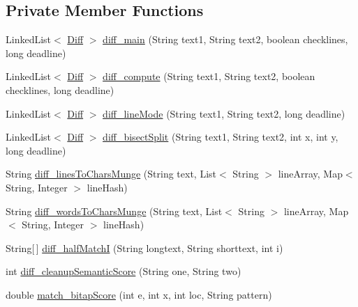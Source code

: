 \subsection*{Private Member Functions}
\begin{DoxyCompactItemize}
\item 
Linked\+List$<$ \hyperlink{classname_1_1fraser_1_1neil_1_1plaintext_1_1diff__match__patch_1_1Diff}{Diff} $>$ \hyperlink{classname_1_1fraser_1_1neil_1_1plaintext_1_1diff__match__patch_a5b206ee4b0fa0861d2dc975bf92708cc}{diff\+\_\+main} (String text1, String text2, boolean checklines, long deadline)
\item 
Linked\+List$<$ \hyperlink{classname_1_1fraser_1_1neil_1_1plaintext_1_1diff__match__patch_1_1Diff}{Diff} $>$ \hyperlink{classname_1_1fraser_1_1neil_1_1plaintext_1_1diff__match__patch_af831eef34cf9fb1526f869c83424b836}{diff\+\_\+compute} (String text1, String text2, boolean checklines, long deadline)
\item 
Linked\+List$<$ \hyperlink{classname_1_1fraser_1_1neil_1_1plaintext_1_1diff__match__patch_1_1Diff}{Diff} $>$ \hyperlink{classname_1_1fraser_1_1neil_1_1plaintext_1_1diff__match__patch_aa4b505e33c9597cffcc81ffbeee67a37}{diff\+\_\+line\+Mode} (String text1, String text2, long deadline)
\item 
Linked\+List$<$ \hyperlink{classname_1_1fraser_1_1neil_1_1plaintext_1_1diff__match__patch_1_1Diff}{Diff} $>$ \hyperlink{classname_1_1fraser_1_1neil_1_1plaintext_1_1diff__match__patch_a7caa378df4183ad8c7e6fc0afa7ef392}{diff\+\_\+bisect\+Split} (String text1, String text2, int x, int y, long deadline)
\item 
String \hyperlink{classname_1_1fraser_1_1neil_1_1plaintext_1_1diff__match__patch_a9ab83844e67949f57ed031c98a1e88d9}{diff\+\_\+lines\+To\+Chars\+Munge} (String text, List$<$ String $>$ line\+Array, Map$<$ String, Integer $>$ line\+Hash)
\item 
String \hyperlink{classname_1_1fraser_1_1neil_1_1plaintext_1_1diff__match__patch_a8e2e50b63d55ec69b6b5413338bc7578}{diff\+\_\+words\+To\+Chars\+Munge} (String text, List$<$ String $>$ line\+Array, Map$<$ String, Integer $>$ line\+Hash)
\item 
String\mbox{[}$\,$\mbox{]} \hyperlink{classname_1_1fraser_1_1neil_1_1plaintext_1_1diff__match__patch_a85b4cb8c6f4dd34bf9cdca1a16261162}{diff\+\_\+half\+MatchI} (String longtext, String shorttext, int i)
\item 
int \hyperlink{classname_1_1fraser_1_1neil_1_1plaintext_1_1diff__match__patch_aab2f9b680e022416729568ceb1c73109}{diff\+\_\+cleanup\+Semantic\+Score} (String one, String two)
\item 
double \hyperlink{classname_1_1fraser_1_1neil_1_1plaintext_1_1diff__match__patch_ae272c15f6f19c7ec2dd81be8376516eb}{match\+\_\+bitap\+Score} (int e, int x, int loc, String pattern)
\end{DoxyCompactItemize}
